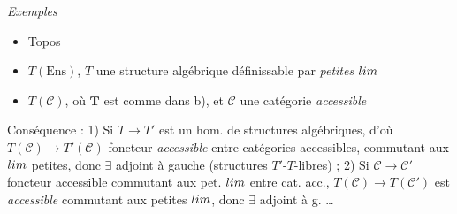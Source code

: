 \documentclass[11pt,a4paper]{article}
\begin{document}

\emph{Exemples}
\begin{itemize}
  \item[a)] Topos \struck{\ill{}} 
  \item[b)] $T(\mathrm{Ens})$, $T$ une structure algébrique définissable par
    \emph{petites} $\varprojlim$
  \item[c)] $T(\mathcal{C})$, où $\mathbf{T}$ est comme dans b), et
    $\mathcal{C}$ une catégorie \emph{accessible}
\end{itemize}
\struck{\ill{}}

Conséquence : 1) Si $T \to T'$ est un hom. de structures algébriques, d'où
$T(\mathcal{C}) \to T'(\mathcal{C})$ foncteur \emph{accessible} entre
catégories accessibles, commutant aux $\varprojlim$ petites, donc $\exists$
adjoint à gauche (structures $T'$-$T$-libres) ; 2) Si $\mathcal{C} \to
\mathcal{C}'$ foncteur accessible commutant aux pet. $\varprojlim$ entre cat.
acc., $T(\mathcal{C}) \to T(\mathcal{C}')$ est \emph{accessible}
commutant aux petites $\varprojlim$, donc $\exists$ adjoint à g. …
\end{document}
